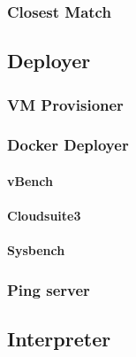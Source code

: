 \documentclass{article}
\begin{document}
\subsubsection{Closest Match}
\subsection{Deployer}
\subsubsection{VM Provisioner}
\subsubsection{Docker Deployer}
\paragraph{vBench}
\paragraph{Cloudsuite3}
\paragraph{Sysbench}
\subsubsection{Ping server}


\subsection{Interpreter}
\end{document}

